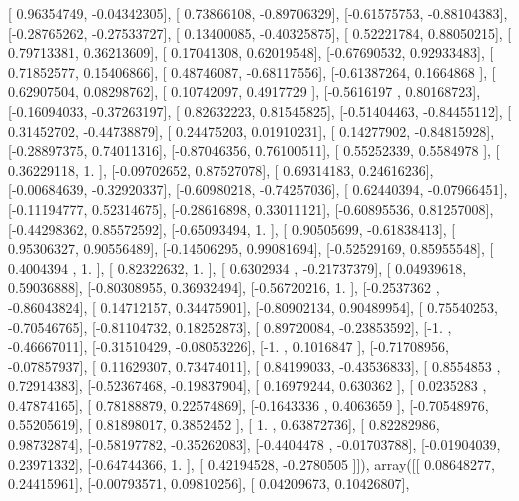 \documentclass{article}
\begin{document}
       [ 0.96354749, -0.04342305],
       [ 0.73866108, -0.89706329],
       [-0.61575753, -0.88104383],
       [-0.28765262, -0.27533727],
       [ 0.13400085, -0.40325875],
       [ 0.52221784,  0.88050215],
       [ 0.79713381,  0.36213609],
       [ 0.17041308,  0.62019548],
       [-0.67690532,  0.92933483],
       [ 0.71852577,  0.15406866],
       [ 0.48746087, -0.68117556],
       [-0.61387264,  0.1664868 ],
       [ 0.62907504,  0.08298762],
       [ 0.10742097,  0.4917729 ],
       [-0.5616197 ,  0.80168723],
       [-0.16094033, -0.37263197],
       [ 0.82632223,  0.81545825],
       [-0.51404463, -0.84455112],
       [ 0.31452702, -0.44738879],
       [ 0.24475203,  0.01910231],
       [ 0.14277902, -0.84815928],
       [-0.28897375,  0.74011316],
       [-0.87046356,  0.76100511],
       [ 0.55252339,  0.5584978 ],
       [ 0.36229118,  1.        ],
       [-0.09702652,  0.87527078],
       [ 0.69314183,  0.24616236],
       [-0.00684639, -0.32920337],
       [-0.60980218, -0.74257036],
       [ 0.62440394, -0.07966451],
       [-0.11194777,  0.52314675],
       [-0.28616898,  0.33011121],
       [-0.60895536,  0.81257008],
       [-0.44298362,  0.85572592],
       [-0.65093494,  1.        ],
       [ 0.90505699, -0.61838413],
       [ 0.95306327,  0.90556489],
       [-0.14506295,  0.99081694],
       [-0.52529169,  0.85955548],
       [ 0.4004394 ,  1.        ],
       [ 0.82322632,  1.        ],
       [ 0.6302934 , -0.21737379],
       [ 0.04939618,  0.59036888],
       [-0.80308955,  0.36932494],
       [-0.56720216,  1.        ],
       [-0.2537362 , -0.86043824],
       [ 0.14712157,  0.34475901],
       [-0.80902134,  0.90489954],
       [ 0.75540253, -0.70546765],
       [-0.81104732,  0.18252873],
       [ 0.89720084, -0.23853592],
       [-1.        , -0.46667011],
       [-0.31510429, -0.08053226],
       [-1.        ,  0.1016847 ],
       [-0.71708956, -0.07857937],
       [ 0.11629307,  0.73474011],
       [ 0.84199033, -0.43536833],
       [ 0.8554853 ,  0.72914383],
       [-0.52367468, -0.19837904],
       [ 0.16979244,  0.630362  ],
       [ 0.0235283 ,  0.47874165],
       [ 0.78188879,  0.22574869],
       [-0.1643336 ,  0.4063659 ],
       [-0.70548976,  0.55205619],
       [ 0.81898017,  0.3852452 ],
       [ 1.        ,  0.63872736],
       [ 0.82282986,  0.98732874],
       [-0.58197782, -0.35262083],
       [-0.4404478 , -0.01703788],
       [-0.01904039,  0.23971332],
       [-0.64744366,  1.        ],
       [ 0.42194528, -0.2780505 ]]), array([[ 0.08648277,  0.24415961],
       [-0.00793571,  0.09810256],
       [ 0.04209673,  0.10426807],
\end{document}
